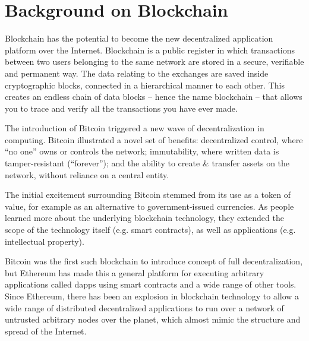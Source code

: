 \section{Background on Blockchain}\label{sec:blockchain}

Blockchain has the potential to become the new decentralized application platform over the Internet. Blockchain is a public register in which transactions between two users belonging to the same network are stored in a secure, verifiable
and permanent way. The data relating to the exchanges are saved inside cryptographic blocks, connected in a hierarchical
manner to each other. This creates an endless chain of data blocks -- hence the name blockchain -- that allows you to
trace and verify all the transactions you have ever made.

The introduction of Bitcoin \cite{nakamoto2009bitcoin} triggered a new wave of decentralization in computing.
Bitcoin illustrated a novel set of benefits: decentralized control, where ``no one'' owns or controls the network;
immutability, where written data is tamper-resistant (``forever''); and the ability to create \& transfer assets on the
network, without reliance on a central entity.

The initial excitement surrounding Bitcoin stemmed from its use as a token of value, for example as an alternative to
government-issued currencies.  As people learned more about the underlying blockchain technology, they extended the
scope of the technology itself (e.g. smart contracts), as well as applications (e.g. intellectual property).

Bitcoin was the first such blockchain to introduce concept of full decentralization, but Ethereum has made this a
general platform for executing arbitrary applications called dapps using smart contracts and a wide range of other
tools. Since Ethereum, there has been an explosion in blockchain technology to allow a wide range of distributed
decentralized applications to run over a network of untrusted arbitrary nodes over the planet, which almost mimic the
structure and spread of the Internet.


